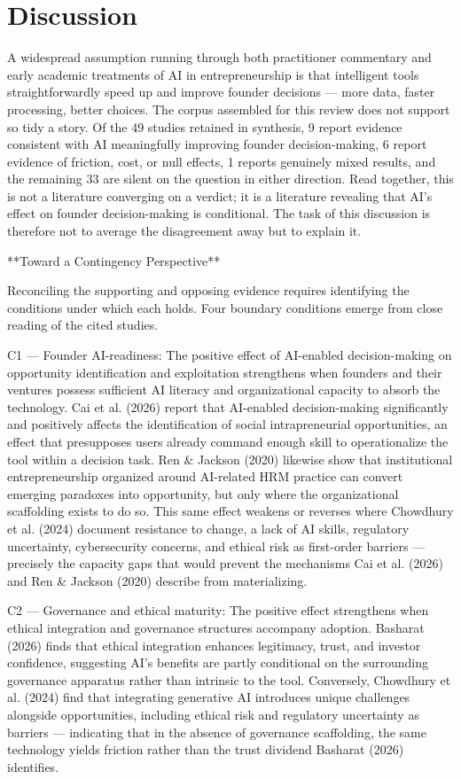 \documentclass[11pt, a4paper]{article}
\begin{document}
\section{Discussion}
A widespread assumption running through both practitioner commentary and early academic treatments of AI in entrepreneurship is that intelligent tools straightforwardly speed up and improve founder decisions — more data, faster processing, better choices. The corpus assembled for this review does not support so tidy a story. Of the 49 studies retained in synthesis, 9 report evidence consistent with AI meaningfully improving founder decision-making, 6 report evidence of friction, cost, or null effects, 1 reports genuinely mixed results, and the remaining 33 are silent on the question in either direction. Read together, this is not a literature converging on a verdict; it is a literature revealing that AI's effect on founder decision-making is conditional. The task of this discussion is therefore not to average the disagreement away but to explain it.

**Toward a Contingency Perspective**

Reconciling the supporting and opposing evidence requires identifying the conditions under which each holds. Four boundary conditions emerge from close reading of the cited studies.

C1 — Founder AI-readiness: The positive effect of AI-enabled decision-making on opportunity identification and exploitation strengthens when founders and their ventures possess sufficient AI literacy and organizational capacity to absorb the technology. Cai et al. (2026) report that AI-enabled decision-making significantly and positively affects the identification of social intrapreneurial opportunities, an effect that presupposes users already command enough skill to operationalize the tool within a decision task. Ren & Jackson (2020) likewise show that institutional entrepreneurship organized around AI-related HRM practice can convert emerging paradoxes into opportunity, but only where the organizational scaffolding exists to do so. This same effect weakens or reverses where Chowdhury et al. (2024) document resistance to change, a lack of AI skills, regulatory uncertainty, cybersecurity concerns, and ethical risk as first-order barriers — precisely the capacity gaps that would prevent the mechanisms Cai et al. (2026) and Ren & Jackson (2020) describe from materializing.

C2 — Governance and ethical maturity: The positive effect strengthens when ethical integration and governance structures accompany adoption. Basharat (2026) finds that ethical integration enhances legitimacy, trust, and investor confidence, suggesting AI's benefits are partly conditional on the surrounding governance apparatus rather than intrinsic to the tool. Conversely, Chowdhury et al. (2024) find that integrating generative AI introduces unique challenges alongside opportunities, including ethical risk and regulatory uncertainty as barriers — indicating that in the absence of governance scaffolding, the same technology yields friction rather than the trust dividend Basharat (2026) identifies.
\end{document}
